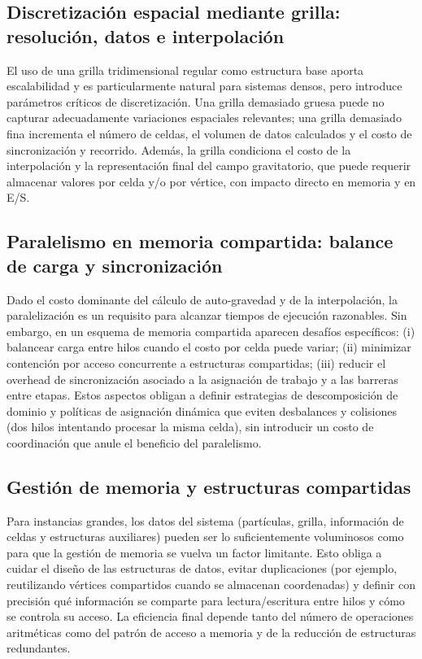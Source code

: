 \documentclass[a4paper,11pt]{book}
\begin{document}
\subsection{Discretización espacial mediante grilla: resolución, datos e interpolación}

El uso de una grilla tridimensional regular como estructura base aporta escalabilidad y es particularmente natural para sistemas densos, pero introduce parámetros críticos de discretización. Una grilla demasiado gruesa puede no capturar adecuadamente variaciones espaciales relevantes; una grilla demasiado fina incrementa el número de celdas, el volumen de datos calculados y el costo de sincronización y recorrido. Además, la grilla condiciona el costo de la interpolación y la representación final del campo gravitatorio, que puede requerir almacenar valores por celda y/o por vértice, con impacto directo en memoria y en E/S.

\subsection{Paralelismo en memoria compartida: balance de carga y sincronización}

Dado el costo dominante del cálculo de auto-gravedad y de la interpolación, la paralelización es un requisito para alcanzar tiempos de ejecución razonables. Sin embargo, en un esquema de memoria compartida aparecen desafíos específicos:
(i) balancear carga entre hilos cuando el costo por celda puede variar;
(ii) minimizar contención por acceso concurrente a estructuras compartidas;
(iii) reducir el overhead de sincronización asociado a la asignación de trabajo y a las barreras entre etapas.
Estos aspectos obligan a definir estrategias de descomposición de dominio y políticas de asignación dinámica que eviten desbalances y colisiones (dos hilos intentando procesar la misma celda), sin introducir un costo de coordinación que anule el beneficio del paralelismo.

\subsection{Gestión de memoria y estructuras compartidas}

Para instancias grandes, los datos del sistema (partículas, grilla, información de celdas y estructuras auxiliares) pueden ser lo suficientemente voluminosos como para que la gestión de memoria se vuelva un factor limitante. Esto obliga a cuidar el diseño de las estructuras de datos, evitar duplicaciones (por ejemplo, reutilizando vértices compartidos cuando se almacenan coordenadas) y definir con precisión qué información se comparte para lectura/escritura entre hilos y cómo se controla su acceso. La eficiencia final depende tanto del número de operaciones aritméticas como del patrón de acceso a memoria y de la reducción de estructuras redundantes.
\end{document}
